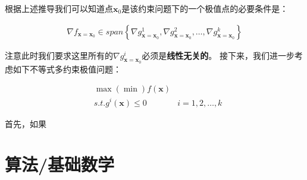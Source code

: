 \documentclass[UTF8]{book}
\begin{document}
根据上述推导我们可以知道点$\mathbf{x}_0$是该约束问题下的一个极值点的必要条件是：
\begin{large}
    \begin{equation}
        \begin{aligned}
            \nabla f_{\mathbf{x}=\mathbf{x}_0} \in span \left \{ \nabla g_{\mathbf{x}=\mathbf{x}_0}^1,\nabla g_{\mathbf{x}=\mathbf{x}_0}^2,\dots,\nabla g_{\mathbf{x}=\mathbf{x}_0}^k \right \}
            \nonumber
        \end{aligned}
    \end{equation}
\end{large}
注意此时我们要求这里所有的$\nabla g_{\mathbf{x}=\mathbf{x}_0}^i$必须是\textbf{线性无关的}。
接下来，我们进一步考虑如下不等式多约束极值问题：
\begin{large}
    \begin{equation}
        \begin{aligned}
            &\max(\min) f(\mathbf{x})& \\
            &s.t. g^i(\mathbf{x}) \le 0& i=1,2,\dots,k
            \nonumber
        \end{aligned}
    \end{equation}
\end{large}
首先，如果

\section{算法/基础数学}
\end{document}
